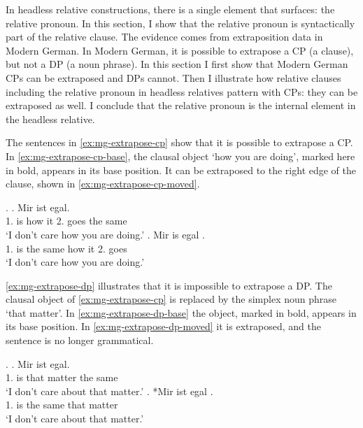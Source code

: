 In headless relative constructions, there is a single element that surfaces: the relative pronoun. In this section, I show that the relative pronoun is syntactically part of the relative clause. The evidence comes from extraposition data in Modern German. In Modern German, it is possible to extrapose a CP (a clause), but not a DP (a noun phrase). In this section I first show that Modern German CPs can be extraposed and DPs cannot. Then I illustrate how relative clauses including the relative pronoun in headless relatives pattern with CPs: they can be extraposed as well. I conclude that the relative pronoun is the internal element in the headless relative.

The sentences in \ref{ex:mg-extrapose-cp} show that it is possible to extrapose a CP. In \ref{ex:mg-extrapose-cp-base}, the clausal object  `how you are doing', marked here in bold, appears in its base position. It can be extraposed to the right edge of the clause, shown in \ref{ex:mg-extrapose-cp-moved}.

\ex.\label{ex:mg-extrapose-cp}
\ag. Mir ist     egal.\\
 1. is how it 2. goes {the same}\\
 `I don't care how you are doing.'\label{ex:mg-extrapose-cp-base}
\bg. Mir is egal    .\\
 1. is {the same} how it 2. goes\\
 `I don't care how you are doing.' \label{ex:mg-extrapose-cp-moved}

\ref{ex:mg-extrapose-dp} illustrates that it is impossible to extrapose a DP. The clausal object of \ref{ex:mg-extrapose-cp} is replaced by the simplex noun phrase  `that matter'.
In \ref{ex:mg-extrapose-dp-base} the object, marked in bold, appears in its base position. In \ref{ex:mg-extrapose-dp-moved} it is extraposed, and the sentence is no longer grammatical.

\ex.\label{ex:mg-extrapose-dp}
\ag. Mir ist   egal.\\
 1. is that matter {the same}\\
 `I don't care about that matter.'\label{ex:mg-extrapose-dp-base}
\bg. *Mir ist egal  .\\
 1. is {the same} that matter\\
 `I don't care about that matter.' \label{ex:mg-extrapose-dp-moved}

